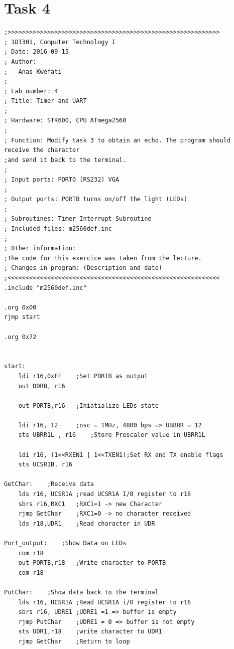 \documentclass[a4paper,12pt]{article}
\begin{document}
\break

\section{Task 4}

\lstset{style=Asm}

\begin{lstlisting}
;>>>>>>>>>>>>>>>>>>>>>>>>>>>>>>>>>>>>>>>>>>>>>>>>>>>>>>>>>>>
; 1DT301, Computer Technology I
; Date: 2016-09-15
; Author:
;	Anas Kwefati
;
; Lab number: 4
; Title: Timer and UART
;
; Hardware: STK600, CPU ATmega2560
;
; Function: Modify task 3 to obtain an echo. The program should receive the character
;and send it back to the terminal. 
;
; Input ports: PORT0 (RS232) VGA
;
; Output ports: PORTB turns on/off the light (LEDs)
;
; Subroutines: Timer Interrupt Subroutine
; Included files: m2560def.inc
;
; Other information:
;The code for this exercice was taken from the lecture.
; Changes in program: (Description and date)
;<<<<<<<<<<<<<<<<<<<<<<<<<<<<<<<<<<<<<<<<<<<<<<<<<<<<<<<<<<<
.include "m2560def.inc"

.org 0x00
rjmp start

.org 0x72


start:
	ldi r16,0xFF	;Set PORTB as output
	out DDRB, r16

	out PORTB,r16	;Iniatialize LEDs state

	ldi r16, 12		;osc = 1MHz, 4800 bps => UBBRR = 12
	sts UBRR1L , r16	;Store Prescaler value in UBRR1L

	ldi r16, (1<<RXEN1 | 1<<TXEN1);Set RX and TX enable flags
	sts UCSR1B, r16

GetChar:	;Receive data
	lds r16, UCSR1A	;read UCSR1A I/0 register to r16
	sbrs r16,RXC1	;RXC1=1 -> new Character
	rjmp GetChar	;RXC1=0 -> no character received
	lds r18,UDR1	;Read character in UDR

Port_output:	;Show Data on LEDs
	com r18
	out PORTB,r18	;Write character to PORTB
	com r18

PutChar:	;Show data back to the terminal
	lds r16, UCSR1A	;Read UCSR1A i/O register to r16
	sbrs r16, UDRE1	;UDRE1 =1 => buffer is empty
	rjmp PutChar	;UDRE1 = 0 => buffer is not empty
	sts UDR1,r18	;write character to UDR1
	rjmp GetChar	;Return to loop

\end{lstlisting}
\end{document}
